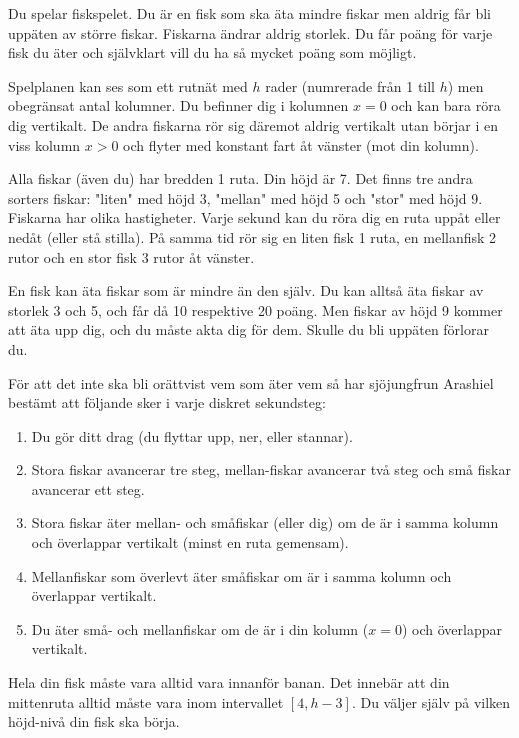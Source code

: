 
Du spelar fiskspelet. Du är en fisk som ska äta mindre fiskar men aldrig får
bli uppäten av större fiskar. Fiskarna ändrar aldrig storlek. Du får poäng för varje fisk du äter och självklart vill du ha så mycket
poäng som möjligt.

Spelplanen kan ses som ett rutnät med $h$ rader (numrerade från 1 till $h$) men obegränsat antal kolumner. Du befinner dig i kolumnen $x=0$ och kan bara röra dig vertikalt. De andra fiskarna rör sig däremot aldrig vertikalt utan börjar i en viss kolumn $x>0$ och flyter med konstant fart åt vänster (mot din kolumn). 

Alla fiskar (även du) har bredden 1 ruta. Din höjd är 7. Det finns tre andra sorters fiskar: "liten" med höjd 3, "mellan" med höjd 5 och "stor" med höjd 9. Fiskarna har olika hastigheter. Varje sekund kan du röra dig en ruta uppåt eller nedåt (eller stå stilla). På samma tid rör sig en liten fisk 1 ruta, en mellanfisk 2 rutor och en stor fisk 3 rutor åt vänster.

En fisk kan äta fiskar som är mindre än den själv. Du kan alltså äta fiskar av storlek 3 och 5, och får då 10 respektive 20 poäng. Men fiskar av höjd 9 kommer att äta upp dig, och du måste akta dig för dem. Skulle du bli uppäten förlorar du. 

För att det inte ska bli orättvist vem som
äter vem så har sjöjungfrun Arashiel bestämt att följande sker i varje diskret
sekundsteg:

\begin{enumerate}
  \item
     Du gör ditt drag (du flyttar upp, ner, eller stannar).
  \item
     Stora fiskar avancerar tre steg, mellan-fiskar avancerar två steg och små fiskar avancerar ett steg.
  \item
     Stora fiskar äter mellan- och småfiskar (eller dig) om de är i samma kolumn och överlappar vertikalt (minst en ruta gemensam).
  \item
     Mellanfiskar som överlevt äter småfiskar om är i samma kolumn och överlappar vertikalt.
  \item
     Du äter små- och mellanfiskar om de är i din kolumn ($x=0$) och överlappar vertikalt.
\end{enumerate}

Hela din fisk måste vara alltid vara innanför banan. Det innebär att
din mittenruta alltid måste vara inom intervallet $[4, h-3]$. Du väljer själv på vilken höjd-nivå din fisk ska börja.

